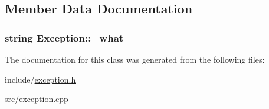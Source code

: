 \subsection{Member Data Documentation}
\hypertarget{classException_48f934fa7a25381d1a9f8f7da7a98525}{
\subsubsection[{\_\-what}]{\setlength{\rightskip}{0pt plus 5cm}string {\bf Exception::\_\-what}}}
\label{classException_48f934fa7a25381d1a9f8f7da7a98525}




The documentation for this class was generated from the following files:\begin{CompactItemize}
\item 
include/\hyperlink{exception_8h}{exception.h}\item 
src/\hyperlink{exception_8cpp}{exception.cpp}\end{CompactItemize}
